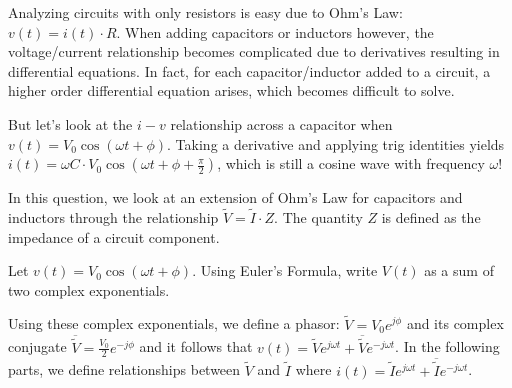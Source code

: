
Analyzing circuits with only resistors is easy due to Ohm's Law: $v(t)=i(t) \cdot R$.
When adding capacitors or inductors however, the voltage/current relationship becomes complicated due to derivatives resulting in differential equations.
In fact, for each capacitor/inductor added to a circuit, a higher order differential equation arises, which becomes difficult to solve.

But let's look at the $i-v$ relationship across a capacitor when $v(t) = V_{0} \cos(\omega{} t+\phi{})$.
Taking a derivative and applying trig identities yields $i(t)=\omega C \cdot V_{0} \cos(\omega{} t + \phi{} + \frac{\pi{}}{2})$, 
which is still a cosine wave with frequency $\omega{}$!

In this question, we look at an extension of Ohm's Law for capacitors and inductors through the relationship $\widetilde{V} = \widetilde{I} \cdot Z$.
The quantity $Z$ is defined as the impedance of a circuit component.

\begin{enumerate}

\qitem Let $v(t) = V_{0} \cos(\omega{}t + \phi{})$.
Using Euler's Formula, write $V(t)$ as a sum of two complex exponentials.


\end{enumerate}

Using these complex exponentials, we define a phasor: $\widetilde{V} = V_{0}e^{j\phi{}}$ and its complex conjugate $\overline{\widetilde{V}} = \frac{V_{0}}{2}e^{-j\phi{}}$ and it follows that $v(t) = \widetilde{V}e^{j\omega{}t} + \overline{\widetilde{V}}e^{-j\omega{}t}$.
In the following parts, we define relationships between $\widetilde{V}$ and $\widetilde{I}$ where $i(t) = \widetilde{I}e^{j\omega{}t} + \overline{\widetilde{I}}e^{-j\omega{}t}$.

